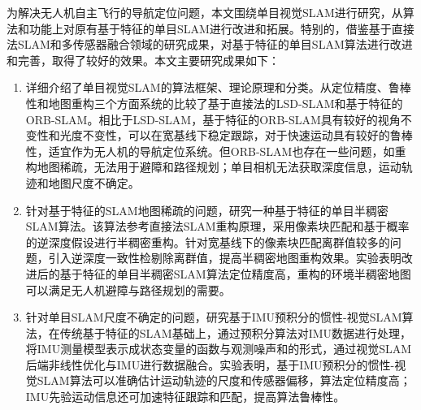 


\begin{conclusion}
为解决无人机自主飞行的导航定位问题，本文围绕单目视觉SLAM进行研究，从算法和功能上对原有基于特征的单目SLAM进行改进和拓展。特别的，借鉴基于直接法SLAM和多传感器融合领域的研究成果，对基于特征的单目SLAM算法进行改进和完善，取得了较好的效果。本文主要研究成果如下：
\begin{enumerate}  [label={(\arabic*)}]
\iffalse
\item 介绍多旋翼无人机导航定位算法发展，详细综述视觉SLAM的流程和核心算法。对视觉SLAM的理论和算法发展进行了总结，对比单目、双目和RGB-D三种传感器特点。结合国内外视觉SLAM的发展现状和发展趋势，本文认为，就算法角度来看，单目视觉SLAM算法未来的发展方向是半稠密程度以上的环境地图重建，从而提供更为丰富的环境信息；从应用层面出发，单目SLAM可与IMU、GPS和激光雷达等多传感器进行数据融合，提供准确的尺度信息，改善单目SLAM鲁棒性。本文的改进工作主要围绕以上两点展开。
\item 针对特定的对象，研究多旋翼无人机的数学模型和控制率设计。完成无人机的动力学和运动学建模,并对非线性部分进行线性化简。根据经典控制理论，设计串级PID控制器控制无人机的位置和姿态。通过MATLAB仿真，验证无人机数学模型的准确性和控制率的可行性，了解其运动特性，便于后续选择适合用于无人机导航定位的单目SLAM算法。
\fi
\item 详细介绍了单目视觉SLAM的算法框架、理论原理和分类。从定位精度、鲁棒性和地图重构三个方面系统的比较了基于直接法的LSD-SLAM和基于特征的ORB-SLAM。相比于LSD-SLAM，基于特征的ORB-SLAM具有较好的视角不变性和光度不变性，可以在宽基线下稳定跟踪，对于快速运动具有较好的鲁棒性，适宜作为无人机的导航定位系统。但ORB-SLAM也存在一些问题，如重构地图稀疏，无法用于避障和路径规划；单目相机无法获取深度信息，运动轨迹和地图尺度不确定。
\item 针对基于特征的SLAM地图稀疏的问题，研究一种基于特征的单目半稠密SLAM算法。该算法参考直接法SLAM重构原理，采用像素块匹配和基于概率的逆深度假设进行半稠密重构。针对宽基线下的像素块匹配离群值较多的问题，引入逆深度一致性检剔除离群值，提高半稠密地图重构效果。实验表明改进后的基于特征的单目半稠密SLAM算法定位精度高，重构的环境半稠密地图可以满足无人机避障与路径规划的需要。
\item 针对单目SLAM尺度不确定的问题，研究基于IMU预积分的惯性-视觉SLAM算法，在传统基于特征的SLAM基础上，通过预积分算法对IMU数据进行处理，将IMU测量模型表示成状态变量的函数与观测噪声和的形式，通过视觉SLAM后端非线性优化与IMU进行数据融合。实验表明，基于IMU预积分的惯性-视觉SLAM算法可以准确估计运动轨迹的尺度和传感器偏移，算法定位精度高；IMU先验运动信息还可加速特征跟踪和匹配，提高算法鲁棒性。
\end{enumerate}


\end{conclusion}
